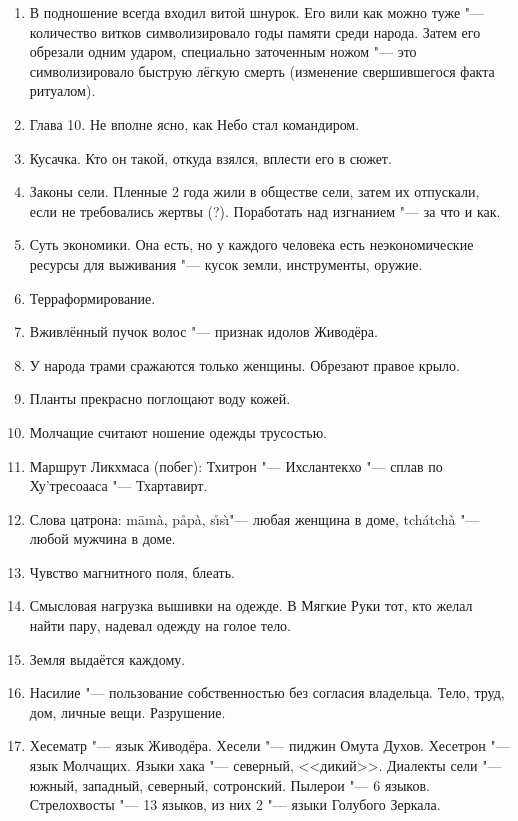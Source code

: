 \begin{enumerate}
\item В подношение всегда входил витой шнурок.
Его вили как можно туже "--- количество витков символизировало годы памяти среди народа.
Затем его обрезали одним ударом, специально заточенным ножом "--- это символизировало быструю лёгкую смерть (изменение свершившегося факта ритуалом).

\item Глава 10.
Не вполне ясно, как Небо стал командиром.

\item Кусачка.
Кто он такой, откуда взялся, вплести его в сюжет.

\item Законы сели.
Пленные 2 года жили в обществе сели, затем их отпускали, если не требовались жертвы (?).
Поработать над изгнанием "--- за что и как.

\item Суть экономики.
Она есть, но у каждого человека есть неэкономические ресурсы для выживания "--- кусок земли, инструменты, оружие.

\item Терраформирование.

\item Вживлённый пучок волос "--- признак идолов Живодёра.

\item У народа трами сражаются только женщины.
Обрезают правое крыло.

\item Планты прекрасно поглощают воду кожей.

\item Молчащие считают ношение одежды трусостью.

\item Маршрут Ликхмаса (побег): Тхитрон "--- Ихслантекхо "--- сплав по Ху'тресоааса "--- Тхартавирт.

\item Слова цатрона: m\=am\`a, p\r{a}p\`a, s\r{\i}s\`\i "--- любая женщина в доме, tch\'atch\`a "--- любой мужчина в доме.

\item Чувство магнитного поля, блеать.

\item Смысловая нагрузка вышивки на одежде.
В Мягкие Руки тот, кто желал найти пару, надевал одежду на голое тело.

\item Земля выдаётся каждому.

\item Насилие "--- пользование собственностью без согласия владельца.
Тело, труд, дом, личные вещи.
Разрушение.

\item Хесематр "--- язык Живодёра.
Хесели "--- пиджин Омута Духов.
Хесетрон "--- язык Молчащих.
Языки хака "--- северный, <<дикий>>.
Диалекты сели "--- южный, западный, северный, сотронский.
Пылерои "--- 6 языков. Стрелохвосты "--- 13 языков, из них 2 "--- языки Голубого Зеркала.
\end{enumerate}


